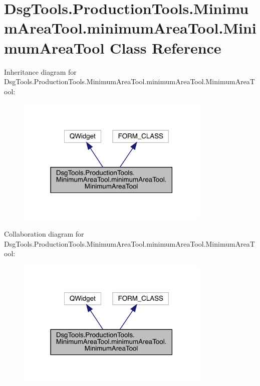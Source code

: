 \hypertarget{class_dsg_tools_1_1_production_tools_1_1_minimum_area_tool_1_1minimum_area_tool_1_1_minimum_area_tool}{}\section{Dsg\+Tools.\+Production\+Tools.\+Minimum\+Area\+Tool.\+minimum\+Area\+Tool.\+Minimum\+Area\+Tool Class Reference}
\label{class_dsg_tools_1_1_production_tools_1_1_minimum_area_tool_1_1minimum_area_tool_1_1_minimum_area_tool}


Inheritance diagram for Dsg\+Tools.\+Production\+Tools.\+Minimum\+Area\+Tool.\+minimum\+Area\+Tool.\+Minimum\+Area\+Tool\+:
\nopagebreak
\begin{figure}[H]
\begin{center}
\leavevmode
\includegraphics[width=262pt]{class_dsg_tools_1_1_production_tools_1_1_minimum_area_tool_1_1minimum_area_tool_1_1_minimum_area_tool__inherit__graph}
\end{center}
\end{figure}


Collaboration diagram for Dsg\+Tools.\+Production\+Tools.\+Minimum\+Area\+Tool.\+minimum\+Area\+Tool.\+Minimum\+Area\+Tool\+:
\nopagebreak
\begin{figure}[H]
\begin{center}
\leavevmode
\includegraphics[width=262pt]{class_dsg_tools_1_1_production_tools_1_1_minimum_area_tool_1_1minimum_area_tool_1_1_minimum_area_tool__coll__graph}
\end{center}
\end{figure}

